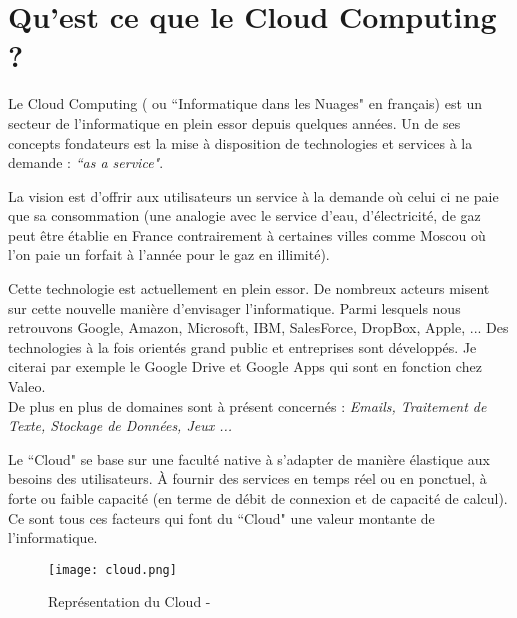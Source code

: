 \section{Qu'est ce que le Cloud Computing ?}

Le Cloud Computing ( ou ``Informatique dans les Nuages" en français) est un secteur de l'informatique en plein essor depuis quelques années.
Un de ses concepts fondateurs est la mise à disposition de technologies et services à la demande : \textit{``as a service"}.

La vision est d'offrir aux utilisateurs un service à la demande où celui ci ne paie que sa consommation (une analogie avec le service  d'eau, d'électricité, de gaz peut être établie en France contrairement à certaines villes comme Moscou où l'on paie un forfait à l'année pour le gaz en illimité).

Cette technologie est actuellement en plein essor. De nombreux acteurs misent sur cette nouvelle manière d'envisager l'informatique. Parmi lesquels nous retrouvons Google, Amazon, Microsoft, IBM, SalesForce, DropBox, Apple, ... Des technologies à la fois orientés grand public et entreprises sont développés. Je citerai par exemple le Google Drive et Google Apps qui sont en fonction chez Valeo.\\
De plus en plus de domaines sont à présent concernés : \emph{Emails, Traitement de Texte, Stockage de Données, Jeux ...}

Le ``Cloud" se base sur une faculté native à s'adapter de manière élastique aux besoins des utilisateurs. À fournir des services en temps réel ou en ponctuel, à forte ou faible capacité (en terme de débit de connexion et de capacité de calcul). Ce sont tous ces facteurs qui font du ``Cloud" une valeur montante de l'informatique.

 \begin{figure}[H]
    \centering
    \texttt{[image: cloud.png]}
	\caption{Représentation du Cloud - \cite{image.cloud.source} }\label{image.cloud} 
\end{figure}
